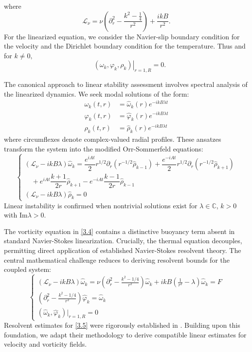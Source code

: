 \documentclass[final, 12pt,reqno]{amsart}
\numberwithin{equation}{section}
\begin{document}
where $$\mathcal{L}_\nu=\nu\left(\partial_r^2-\frac{k^2-\frac{1}{4}}{r^2}\right) +\frac{i k B}{r^2}.$$
For the linearized equation, we consider the Navier-slip boundary condition for the velocity and the Dirichlet  boundary condition for the temperature.
Thus and for $k\neq 0,$
$$\left.\quad (\omega_k,\varphi_k,\rho_k)\right|_{r=1, R}=0.$$

The canonical approach to linear stability assessment involves spectral analysis of the linearized dynamics. We seek modal solutions of the form:
\begin{align*}
\omega_k(t,r) &= \hat{\omega}_k(r) e^{-ikB\lambda t} \\
\varphi_k(t,r) &= \hat{\varphi}_k(r) e^{-ikB\lambda t} \\
\rho_k(t,r) &= \hat{\rho}_k(r) e^{-ikB\lambda t}
\end{align*}
where circumflexes denote complex-valued radial profiles. These ansatzes transform the system into the modified Orr-Sommerfeld equations:
\begin{equation}\label{3.4}
\begin{cases}
(\mathcal{L}_\nu - ikB\lambda)\hat{\omega}_k = \dfrac{e^{iAt}}{2} r^{1/2}\partial_r(r^{-1/2}\hat{\rho}_{k-1}) + \dfrac{e^{-iAt}}{2} r^{1/2}\partial_r(r^{-1/2}\hat{\rho}_{k+1}) \\
\quad + e^{iAt}\dfrac{k+1}{2r}\hat{\rho}_{k+1} - e^{-iAt}\dfrac{k-1}{2r}\hat{\rho}_{k-1} \\[2ex]
(\mathcal{L}_\nu - ikB\lambda)\hat{\rho}_k = 0
\end{cases}
\end{equation}
Linear instability is confirmed when nontrivial solutions exist for $\lambda \in \mathbb{C}$, $k > 0$ with $\text{Im}\lambda > 0$.

The vorticity equation in \eqref{3.4} contains a distinctive buoyancy term absent in standard Navier-Stokes linearization. Crucially, the thermal equation decouples, permitting direct application of established Navier-Stokes resolvent theory. The central mathematical challenge reduces to deriving resolvent bounds for the coupled system:
\begin{equation}\label{3.5}
\begin{cases}
(\mathcal{L}_\nu - ikB\lambda)\hat{\omega}_k = \nu\left(\partial_r^2 - \frac{k^2 - 1/4}{r^2}\right) \hat{\omega}_k + ikB\left(\frac{1}{r^2} - \lambda\right)\hat{\omega}_k = F \\[1ex]
\left(\partial_r^2 - \frac{k^2 - 1/4}{r^2}\right) \hat{\varphi}_k = \hat{\omega}_k \\[1ex]
(\hat{\omega}_k,\hat{\varphi}_k)|_{r=1,R} = 0
\end{cases}
\end{equation}
Resolvent estimates for \eqref{3.5} were rigorously established in \cite{An.2024}. Building upon this foundation, we adapt their methodology to derive compatible linear estimates for velocity and vorticity fields.
\end{document}
